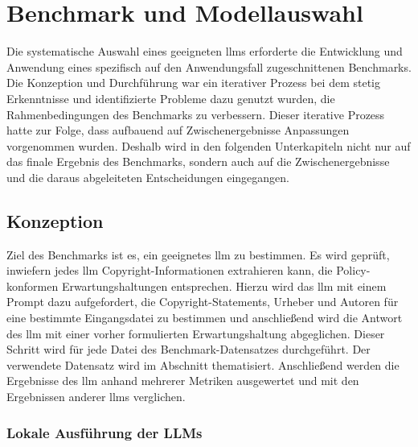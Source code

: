 \chapter{Benchmark und Modellauswahl}\label{ch:benchmark}

Die systematische Auswahl eines geeigneten \glspl{llm} erforderte die Entwicklung und Anwendung eines spezifisch auf den Anwendungsfall zugeschnittenen Benchmarks.
Die Konzeption und Durchführung war ein iterativer Prozess bei dem stetig Erkenntnisse und identifizierte Probleme dazu genutzt wurden, die Rahmenbedingungen des Benchmarks zu verbessern.
Dieser iterative Prozess hatte zur Folge, dass aufbauend auf Zwischenergebnisse Anpassungen vorgenommen wurden.
Deshalb wird in den folgenden Unterkapiteln nicht nur auf das finale Ergebnis des Benchmarks, sondern auch auf die Zwischenergebnisse und die daraus abgeleiteten Entscheidungen eingegangen.


\section{Konzeption}\label{sec:konzeption-benchmark}

Ziel des Benchmarks ist es, ein geeignetes \gls{llm} zu bestimmen.
Es wird geprüft, inwiefern jedes \gls{llm} Copyright-Informationen extrahieren kann, die Policy-konformen Erwartungshaltungen entsprechen.
Hierzu wird das \gls{llm} mit einem Prompt dazu aufgefordert, die Copyright-Statements, Urheber und Autoren für eine bestimmte Eingangsdatei zu bestimmen und anschließend wird die Antwort des \gls{llm} mit einer vorher formulierten Erwartungshaltung abgeglichen.
Dieser Schritt wird für jede Datei des Benchmark-Datensatzes durchgeführt.
Der verwendete Datensatz wird im Abschnitt  thematisiert.
Anschließend werden die Ergebnisse des \gls{llm} anhand mehrerer Metriken ausgewertet und mit den Ergebnissen anderer \glspl{llm} verglichen.

\subsection{Lokale Ausführung der LLMs}\label{subsec:lokale-ausfuehrung}

